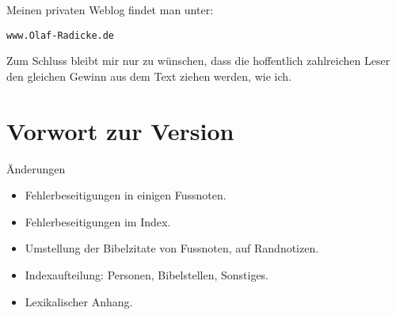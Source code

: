 Meinen privaten Weblog findet man unter:

\begin{center}
\texttt{www.Olaf-Radicke.de}
\end{center}

Zum Schluss bleibt mir nur zu wünschen, dass die hoffentlich zahlreichen Leser
den gleichen Gewinn aus dem Text ziehen werden, wie ich.


\chapter{Vorwort zur Version \versionsnummer}

Änderungen

\begin{itemize}
 \item Fehlerbeseitigungen in einigen Fussnoten.
 \item Fehlerbeseitigungen im Index.
 \item Umstellung der Bibelzitate von Fussnoten, auf Randnotizen.
 \item Indexaufteilung: Personen, Bibelstellen, Sonstiges.
 \item Lexikalischer Anhang.
\end{itemize}



